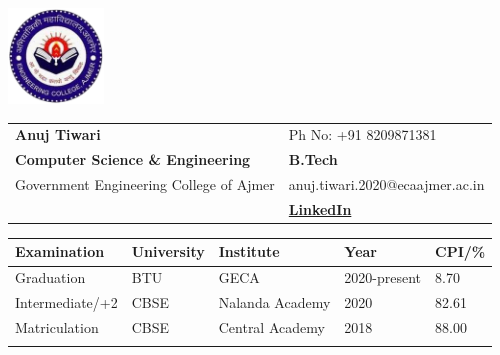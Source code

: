 \documentclass[a4paper,10pt]{article}
\begin{document}

\begin{table}
    \begin{minipage}{0.15\linewidth}
        \centering
        \includegraphics[height =1.0in]{hi.png}
    \end{minipage}
    \begin{minipage}{0.65\linewidth}
        \setlength{\tabcolsep}{30pt}
        \def\arraystretch{1.15}
        \begin{tabular}{ll}
            \textbf{\Large{Anuj Tiwari}}  &  {Ph No: +91 8209871381} \\
            \textbf{Computer Science \& Engineering} & \textbf{B.Tech} \\
            Government Engineering College of Ajmer &  {anuj.tiwari.2020@ecaajmer.ac.in}\\
            &\href{https://www.linkedin.com/in/anuj-tiwari-4130a3217/}{\textbf{LinkedIn}}\\
        \end{tabular}
    \end{minipage}\hfill
\end{table}    

\setlength{\tabcolsep}{25pt}
\begin{table}
\centering
\begin{tabular}{lllll}
\toprule
\textbf{Examination}    & \textbf{University}   & \textbf{Institute}    & \textbf{Year}     & \textbf{CPI/\%} \\ 
\toprule
Graduation  & BTU & GECA & 2020-present   & 8.70\\ 
Intermediate/+2     & CBSE   & Nalanda Academy & 2020      & 82.61    \\ 
Matriculation   & CBSE   & Central Academy    & 2018          &  88.00   \\
\bottomrule \\[-0.75cm]
\end{tabular}
\end{table}
\end{document}
